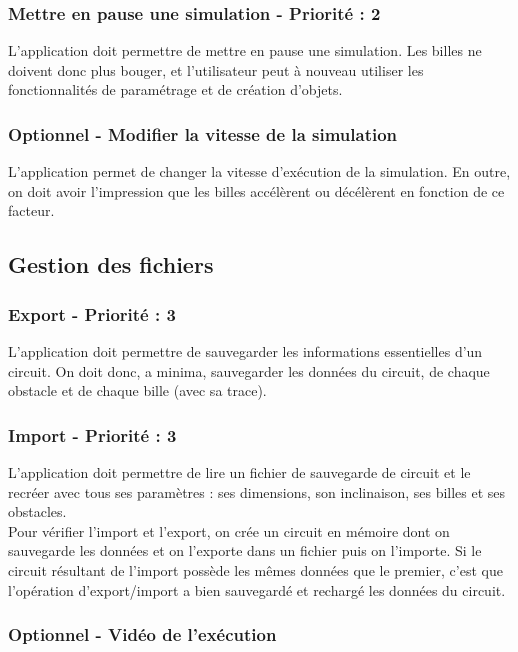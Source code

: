 \documentclass{report}
\begin{document}
\subsubsection{Mettre en pause une simulation - Priorité : 2}

L’application doit permettre de mettre en pause une simulation. Les billes ne doivent donc plus bouger, et l’utilisateur peut à nouveau utiliser les fonctionnalités de paramétrage et de création d’objets.

\subsubsection{Optionnel - Modifier la vitesse de la simulation}

L’application permet de changer la vitesse d’exécution de la simulation. En outre, on doit avoir l’impression que les billes accélèrent ou décélèrent en fonction de ce facteur.

\subsection{Gestion des fichiers}

\subsubsection{Export - Priorité : 3}

L’application doit permettre de sauvegarder les informations essentielles d’un circuit. On doit donc, a minima, sauvegarder les données du circuit, de chaque obstacle et de chaque bille (avec sa trace).

\subsubsection{Import - Priorité : 3}

L’application doit permettre de lire un fichier de sauvegarde de circuit et le recréer avec tous ses paramètres : ses dimensions, son inclinaison, ses billes et ses obstacles. \\

Pour vérifier l’import et l’export, on crée un circuit en mémoire dont on sauvegarde les données et on l’exporte dans un fichier puis on l’importe. Si le circuit résultant de l’import possède les mêmes données que le premier, c’est que l’opération d’export/import a bien sauvegardé et rechargé les données du circuit.

\subsubsection{Optionnel - Vidéo de l'exécution}
\end{document}
